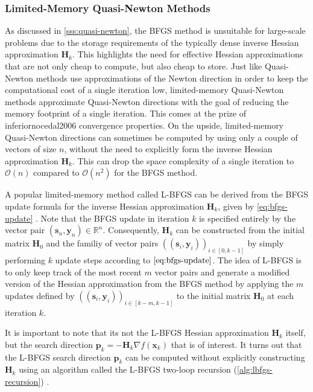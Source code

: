 \subsubsection{Limited-Memory Quasi-Newton Methods}\label{sss:limited-memory-quasi-newton}
As discussed in \cref{sss:quasi-newton}, the BFGS method is unsuitable for large-scale problems due to the storage requirements of the 
typically dense inverse Hessian approximation $\bm{H}_k$. This highlights the need for effective Hessian approximations that are not only
cheap to compute, but also cheap to store. Just like Quasi-Newton methods use approximations of the Newton direction in order to keep 
the computational cost of a single iteration low, limited-memory Quasi-Newton methods approximate Quasi-Newton directions with 
the goal of reducing the memory footprint of a single iteration. This comes at the prize of inferiornocedal2006 convergence properties. On the upside,
limited-memory Quasi-Newton directions can sometimes be computed by using only a couple of vectors of size $n$, without the need to 
explicitly form the inverse Hessian approximation $\bm{H}_k$. This can drop the space complexity of a single iteration to $\mathcal{O}(n)$ 
compared to $\mathcal{O}(n^2)$ for the BFGS method.

A popular limited-memory method called L-BFGS can be derived from the BFGS update formula for the inverse Hessian approximation 
$\bm{H}_k$, given by \cref{eq:bfgs-update} \cite{nocedal2006}. Note that the BFGS update in iteration $k$ is specified entirely 
by the vector 
pair $(\bm{s}_n, \bm{y}_n) \in \mathbb{R}^n$. Consequently, $\bm{H}_k$ can be constructed from the initial matrix $\bm{H}_0$ and the familiy 
of vector pairs $((\bm{s}_i, \bm{y}_i))_{i \in [0, k-1]}$ by simply performing $k$ update steps according to $\cref{eq:bfgs-update}$.
The idea of L-BFGS is to only keep track of the most recent $m$ vector pairs and generate a modified version of the Hessian approximation 
from the BFGS method by applying the $m$ updates defined by $((\bm{s}_i, \bm{y}_i))_{i \in [k-m, k-1]}$ to the 
initial matrix $\bm{H}_0$ at each iteration $k$.

It is important to note that its not the L-BFGS Hessian approximation $\bm{H}_k$ itself, but the search direction $\bm{p}_k = -\bm{H}_k 
\nabla f(\bm{x}_k)$ that is of interest. It turns out that the L-BFGS search direction $\bm{p}_k$ can be computed without explicitly 
constructing $\bm{H}_k$ using an algorithm called the L-BFGS two-loop recursion (\cref{alg:lbfgs-recursion}) \cite{nocedal2006}.

